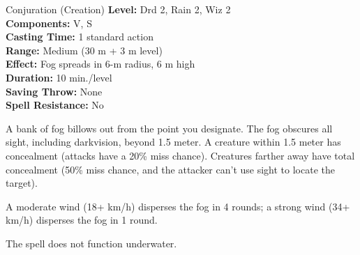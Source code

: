 {Conjuration (Creation)}
{
	\textbf{Level:}
	Drd 2, Rain 2, Wiz 2\\
	\textbf{Components:}
	V, S\\
	\textbf{Casting Time:}
	1 standard action\\
	\textbf{Range:}
	Medium (30 m + 3 m level)\\
	\textbf{Effect:}
	Fog spreads in 6-m radius, 6 m high\\
	\textbf{Duration:}
	10 min./level\\
	\textbf{Saving Throw:}
	None\\
	\textbf{Spell Resistance:}
	No\\
}
{
	A bank of fog billows out from the point you designate. The fog obscures all sight, including darkvision, beyond 1.5 meter. A creature within 1.5 meter has concealment (attacks have a 20\% miss chance). Creatures farther away have total concealment (50\% miss chance, and the attacker can't use sight to locate the target).

	A moderate wind (18+ km/h) disperses the fog in 4 rounds; a strong wind (34+ km/h) disperses the fog in 1 round.

	The spell does not function underwater.

}
